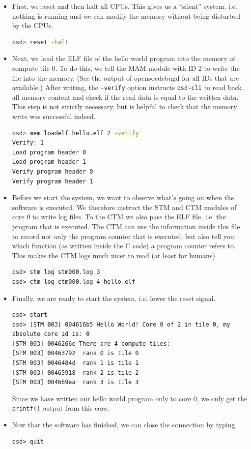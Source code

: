 \begin{itemize}
\item First, we reset and then halt all CPUs.
  This gives us a ``silent'' system, i.e. nothing is running and we can modify the memory without being disturbed by the CPUs.
\begin{lstlisting}[language=sh]
osd> reset -halt
\end{lstlisting}

\item Next, we load the ELF file of the hello world program into the memory of compute tile 0.
  To do this, we tell the MAM module with ID 2 to write the file into the memory. (See the output of opensocdebugd for all IDs that are available.)
  After writing, the \verb|-verify| option instructs \verb|osd-cli| to read back all memory content and check if the read data is equal to the written data.
  This step is not strictly necessary, but is helpful to check that the memory write was successful indeed.
\begin{lstlisting}[language=sh]
osd> mem loadelf hello.elf 2 -verify
Verify: 1
Load program header 0
Load program header 1
Verify program header 0
Verify program header 1
\end{lstlisting}

\item Before we start the system, we want to observe what's going on when the software is executed.
  We therefore instruct the STM and CTM modules of core 0 to write log files.
  To the CTM we also pass the ELF file, i.e. the program that is executed.
  The CTM can use the information inside this file to record not only the program counter that is executed, but also tell you which function (as written inside the C code) a program counter refers to.
  This makes the CTM logs much nicer to read (at least for humans).

\begin{lstlisting}
osd> stm log stm000.log 3
osd> ctm log ctm000.log 4 hello.elf
\end{lstlisting}

\item Finally, we are ready to start the system, i.e. lower the reset signal.
\begin{lstlisting}
osd> start
osd> [STM 003] 004616b5 Hello World! Core 0 of 2 in tile 0, my absolute core id is: 0
[STM 003] 0046266e There are 4 compute tiles:
[STM 003] 00463792  rank 0 is tile 0
[STM 003] 0046484d  rank 1 is tile 1
[STM 003] 00465918  rank 2 is tile 2
[STM 003] 004669ea  rank 3 is tile 3
\end{lstlisting}

Since we have written our hello world program only to core 0, we only get the \verb|printf()| output from this core.

\item Now that the software has finished, we can close the connection by typing
\begin{lstlisting}
osd> quit
\end{lstlisting}
\end{itemize}

